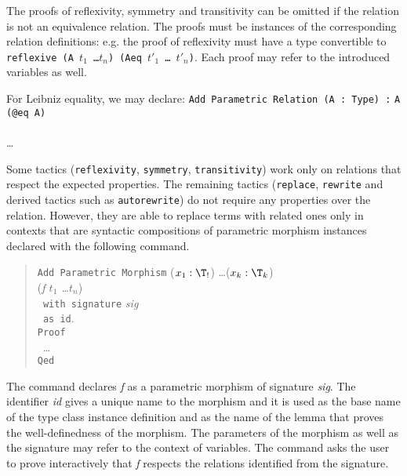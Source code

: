 The proofs of reflexivity, symmetry and transitivity can be omitted if the
relation is not an equivalence relation. The proofs must be instances of the
corresponding relation definitions: e.g. the proof of reflexivity must
have a type convertible to \texttt{reflexive (A $t_1$ \ldots $t_n$) (Aeq $t'_1$ \ldots
  $t'_n$)}. Each proof may refer to the introduced variables as well. 

\begin{cscexample}
For Leibniz equality, we may declare:
\texttt{Add Parametric Relation (A : Type) :} \texttt{A (@eq A)}\\
~\\
\ldots
\end{cscexample}

Some tactics
(\texttt{reflexivity}, \texttt{symmetry}, \texttt{transitivity}) work only
on relations that respect the expected properties. The remaining tactics
(\texttt{replace}, \texttt{rewrite} and derived tactics such as
\texttt{autorewrite}) do not require any properties over the relation.
However, they are able to replace terms with related ones only in contexts
that are syntactic compositions of parametric morphism instances declared with
the following command.

\begin{quote}
  \texttt{Add Parametric Morphism} ($x_1 : \T_!$) \ldots ($x_k : \T_k$)\\
  (\textit{f $t_1$ \ldots $t_n$})\\
  \texttt{~with signature} \textit{sig}\\
  \texttt{~as id}.\\
  \texttt{Proof}\\
  ~\ldots\\
  \texttt{Qed}
\end{quote}

The command declares \textit{f} as a parametric morphism of signature
\textit{sig}. The identifier \textit{id} gives a unique name to the morphism
and it is used as the base name of the type class instance definition 
and as the name of the lemma that proves the well-definedness of the morphism.
The parameters of the morphism as well as the signature may refer to the
context of variables.
The command asks the user to prove interactively that \textit{f} respects
the relations identified from the signature.

